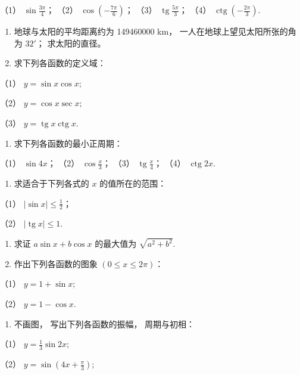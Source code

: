 （1） \(\sin \frac{3\pi}{4}\)； （2）
\(\cos \left(-\frac{7\pi}{6}\right)\)； （3）
\(\operatorname{tg} \frac{5\pi}{3}\)； （4）
\(\operatorname{ctg} \left(-\frac{2\pi}{3}\right)\).

\begin{enumerate}[start=2]
\item
  地球与太阳的平均距离约为 149460000 km， 一人在地球上望见太阳所张的角为
  \(32'\)； 求太阳的直径。
\item
  求下列各函数的定义域：
\end{enumerate}

（1） \(y = \sin x \cos x;\)

（2） \(y = \cos x \sec x;\)

（3） \(y = \operatorname{tg} x \operatorname{ctg} x.\)

\begin{enumerate}[start=4]
\item
  求下列各函数的最小正周期：
\end{enumerate}

（1） \(\sin 4x\)； （2） \(\cos \frac{x}{3}\)； （3）
\(\operatorname{tg} \frac{x}{4}\)； （4） \(\operatorname{ctg} 2x\).

\begin{enumerate}[start=5]
\item
  求适合于下列各式的 \(x\) 的值所在的范围：
\end{enumerate}

（1） \(|\sin x| \leqslant \frac{1}{2}\)；

（2） \(|\operatorname{tg} x| \leqslant 1\).

\begin{enumerate}[start=6]
\item
  求证 \(a \sin x + b \cos x\) 的最大值为 \(\sqrt{a^2 + b^2}\).
\item
  作出下列各函数的图象 \((0 \leqslant x \leqslant 2\pi)\)：
\end{enumerate}

（1） \(y = 1 + \sin x;\)

（2） \(y = 1 - \cos x.\)

\begin{enumerate}[start=8]
\item
  不画图， 写出下列各函数的振幅， 周期与初相：
\end{enumerate}

（1） \(y = \frac{1}{3} \sin 2x;\)

（2） \(y = \sin \left(4x + \frac{\pi}{3}\right);\)

